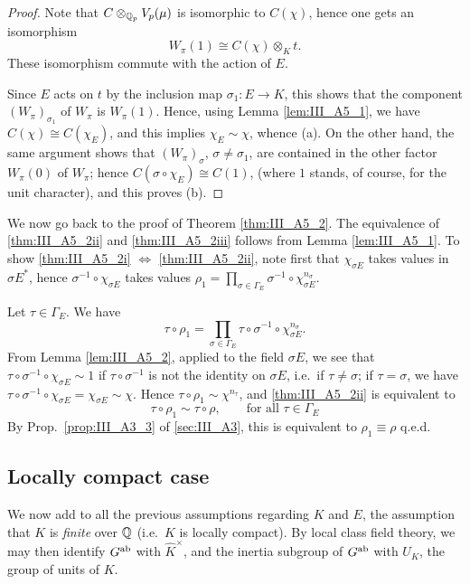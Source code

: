 \begin{subappendices}
\begin{proof}
Note that $C \otimes_{\mathbb{Q}_p} V_p(\mu)$ is isomorphic to $C(\chi)$, hence one gets
an isomorphism
\[
	W_\pi(1) \cong C(\chi) \otimes_K t. 
\]
These isomorphism commute with the action of $E$.

Since $E$ acts on $t$ by the inclusion map $\sigma_1 \colon  E \to K$, this
shows that the component $(W_\pi)_{\sigma_1}$ of $W_\pi$ is $W_\pi(1)$. Hence,
using Lemma \ref{lem:III_A5_1}, we have $C(\chi) \cong C(\chi_E)$, and this
implies $\chi_E \sim \chi$, whence (a). On the other hand, the same argument
shows that $(W_\pi)_\sigma$, $\sigma \neq \sigma_1$, are contained in the other
factor $W_\pi(0)$ of $W_\pi$; hence $C(\sigma \circ \chi_E) \cong C(1)$, (where
$1$ stands, of course, for the unit character), and this proves (b).
\end{proof}

We now go back to the proof of Theorem \ref{thm:III_A5_2}. The equivalence of
\ref{thm:III_A5_2ii} and \ref{thm:III_A5_2iii} follows from Lemma
\ref{lem:III_A5_1}. To show \ref{thm:III_A5_2i} $\iff$ \ref{thm:III_A5_2ii},
note first that $\chi_{\sigma E}$ takes values in $\sigma E^*$, hence
$\sigma^{-1} \circ \chi_{\sigma E}$ takes values $\rho_1 = \prod_{\sigma \in
\Gamma_E} \sigma^{-1} \circ \chi^{n_\sigma}_{\sigma E}$.
\dpage

Let $\tau \in \Gamma_E$. We have
\[
	\tau \circ \rho_1
	= \prod_{\sigma \in \Gamma_E} \tau \circ \sigma^{-1} \circ \chi_{\sigma
	E}^{n_\sigma}.
\]
From Lemma \ref{lem:III_A5_2}, applied to the field $\sigma E$, we see that
$\tau \circ \sigma^{-1} \circ \chi_{\sigma E} \sim 1$ if $\tau \circ
\sigma^{-1}$ is not the identity on $\sigma E$, i.e.\ if $\tau \neq \sigma$; if
$\tau = \sigma$, we have $\tau \circ \sigma^{-1} \circ \chi_{\sigma E} =
\chi_{\sigma E} \sim \chi$. Hence $\tau \circ \rho_1 \sim \chi^{n_\tau}$, and
\ref{thm:III_A5_2ii} is equivalent to 
\[
	\tau \circ \rho_1 \sim \tau \circ \rho, \qquad \text{for all $\tau \in
\Gamma_E$}
\]
By Prop.~\ref{prop:III_A3_3} of \ref{sec:III_A3}, this is equivalent to $\rho_1
\equiv \rho$ \hfill q.e.d.

\subsection{Locally compact case}
\label{sec:III_A6}
We now add to all the previous assumptions regarding $K$ and
$E$, the assumption that $K$ is \emph{finite} over $\mathbb{Q}$ (i.e.\ $K$ is locally
compact). By local class field theory, we may then identify $G^{\mathrm{ab}}$
with $\widehat{K}^\times$, and the inertia subgroup of $G^{\mathrm{ab}}$ with $U_K$, the group
of units of $K$.


\end{subappendices}
